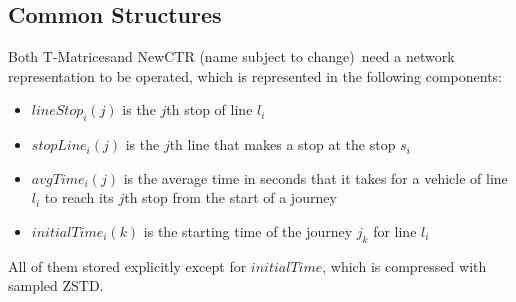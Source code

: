 \documentclass[runningheads]{llncs}
\newcommand{\acumm}{T-Matrices} %
\newcommand{\ctr}{NewCTR (name subject to change)\ }
\begin{document}
\subsection{Common Structures}
Both \acumm and \ctr need a network representation to be operated, which is represented in the following components:

\begin{itemize}
    \item $lineStop_i(j)$ is the $j$th stop of line $l_i$
    \item $stopLine_i(j)$ is the $j$th line that makes a stop at the stop $s_i$
    \item $avgTime_i(j)$ is the average time in seconds that it takes for a vehicle of line $l_i$ to reach its $j$th stop from the start of a journey
    \item $initialTime_i(k)$ is the starting time of the journey $j_k$ for line $l_i$
\end{itemize}

All of them stored explicitly except for $initialTime$, which is compressed with sampled ZSTD.

\begin{algorithm}[H]
 
 
 \caption{Obtaining the codes of the journeys from the line \l that should arrive to the stop \s within the time range given by \ta and \tz}
\end{algorithm}
\end{document}
